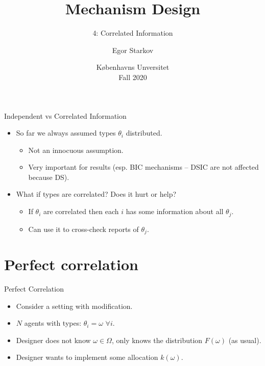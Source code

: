 \documentclass[english,10pt
,aspectratio=169
]{beamer}
\title{Mechanism Design}
\subtitle{4: Correlated Information}
\author{Egor Starkov}
\date{K{\o}benhavns Unversitet \\
	Fall 2020}
\begin{document}
	\frame[plain]{\titlepage}



\begin{frame}{Independent vs Correlated Information}
\begin{itemize}
	\item So far we always assumed types $\theta_i$  distributed.
	\begin{itemize}
		\item Not an innocuous assumption.
		\item Very important for results (esp. BIC mechanisms -- DSIC are not affected because DS).
	\end{itemize}
	\item What if types are \alert{correlated}? Does it hurt or help?
	\begin{itemize}
		\item If $\theta_i$ are correlated then each $i$ has some information about all $\theta_j$.
		\item Can use it to cross-check reports of $\theta_j$.
	\end{itemize}
\end{itemize}
\end{frame}


\section{Perfect correlation}

\begin{frame}{Perfect Correlation}
\begin{itemize}
	\item Consider a  setting with modification.
	\item $N$ agents with  types: $\theta_i = \omega$ $\forall i$.
	\item Designer does not know $\omega \in \Omega$, only knows the distribution $F(\omega)$ (as usual).
	\item Designer wants to implement some allocation $k(\omega)$.
\end{itemize}
\end{frame}
\end{document}
